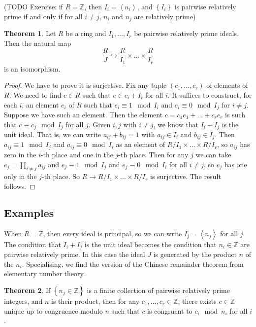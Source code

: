 \documentclass{article}
\newcommand{\Z}{\mathbb{Z}}
\newcommand{\rb}[1]{\left( #1 \right)}
\newcommand{\cb}[1]{\left\{ #1 \right\}}
\newcommand{\ab}[1]{\left\langle #1 \right\rangle}
\theoremstyle{definition}\newtheorem{definition}{Definition}[subsection]
\theoremstyle{definition}\newtheorem{remark}[definition]{Remark}
\theoremstyle{definition}\newtheorem*{example}{Example}
\theoremstyle{definition}\newtheorem*{note}{Note}
\newtheorem{theorem}[definition]{Theorem}
\begin{document}
(TODO Exercise: if $ R = \Z $, then $ I_i = \ab{n_i} $, and $ \cb{I_i} $ is pairwise relatively prime if and only if for all $ i \ne j $, $ n_i $ and $ n_j $ are relatively prime)

\begin{theorem}
Let $ R $ be a ring and $ I_1, \dots, I_r $ be pairwise relatively prime ideals. Then the natural map
$$ \dfrac{R}{J} \hookrightarrow \dfrac{R}{I_1} \times \dots \times \dfrac{R}{I_r} $$
is an isomorphism.
\end{theorem}

\begin{proof}
We have to prove it is surjective. Fix any tuple $ \rb{c_1, \dots, c_r} $ of elements of $ R $. We need to find $ c \in R $ such that $ c \in c_i + I_i $ for all $ i $. It suffices to construct, for each $ i $, an element $ e_i $ of $ R $ such that $ e_i \equiv 1 \mod I_i $ and $ e_i \equiv 0 \mod I_j $ for $ i \ne j $. Suppose we have such an element. Then the element $ c = c_1e_1 + \dots + c_re_r $ is such that $ c \equiv c_j \mod I_j $ for all $ j $. Given $ i, j $ with $ i \ne j $, we know that $ I_i + I_j $ is the unit ideal. That is, we can write $ a_{ij} + b_{ij} = 1 $ with $ a_{ij} \in I_i $ and $ b_{ij} \in I_j $. Then $ a_{ij} \equiv 1 \mod I_j $ and $ a_{ij} \equiv 0 \mod I_i $ as an element of $ R / I_1 \times \dots \times R / I_r $, so $ a_{ij} $ has zero in the $ i $-th place and one in the $ j $-th place. Then for any $ j $ we can take $ e_j = \prod_{i \ne j} a_{ij} $ and $ e_j \equiv 1 \mod I_j $ and $ e_j \equiv 0 \mod I_i $ for all $ i \ne j $, so $ e_j $ has one only in the $ j $-th place. So $ R \to R / I_1 \times \dots \times R / I_r $ is surjective. The result follows.
\end{proof}

\subsection{Examples}

When $ R = \Z $, then every ideal is principal, so we can write $ I_j = \ab{n_j} $ for all $ j $. The condition that $ I_i + I_j $ is the unit ideal becomes the condition that $ n_i \in \Z $ are pairwise relatively prime. In this case the ideal $ J $ is generated by the product $ n $ of the $ n_i $. Specialising, we find the version of the Chinese remainder theorem from elementary number theory.

\begin{theorem}
If $ \cb{n_j \in \Z} $ is a finite collection of pairwise relatively prime integers, and $ n $ is their product, then for any $ c_1, \dots, c_r \in \Z $, there exists $ c \in \Z $ unique up to congruence modulo $ n $ such that $ c $ is congruent to $ c_i \mod n_i $ for all $ i $.
\end{theorem}
\end{document}
